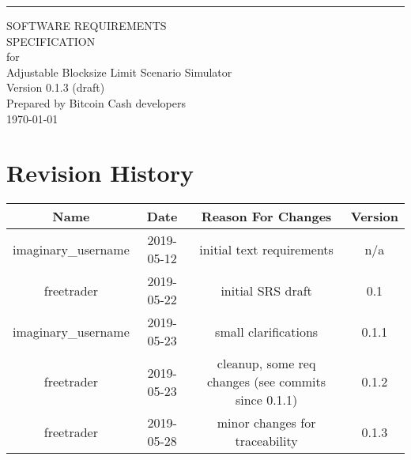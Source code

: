 \documentclass{scrreprt}
\date{}
\def\myversion{0.1.3 }
\begin{document}
\begin{flushright}
  \rule{16cm}{5pt}\vskip1cm
  \begin{bfseries}
    \Huge{SOFTWARE REQUIREMENTS\\ SPECIFICATION}\\
    \vspace{1.9cm}
    for\\
    \vspace{1.9cm}
    Adjustable Blocksize Limit Scenario Simulator\\
    \vspace{1.9cm}
    \LARGE{Version \myversion (draft)}\\
    \vspace{1.9cm}
    Prepared by Bitcoin Cash developers\\
    \vspace{1.9cm}
    \today\\
  \end{bfseries}
\end{flushright}

\tableofcontents

\chapter*{Revision History}

  \begin{center}
    \begin{tabular}{|c|c|c|c|}
      \hline
      Name                & Date       & Reason For Changes                                  & Version \\
      \hline
      imaginary\_username & 2019-05-12 & initial text requirements                           & n/a     \\
      \hline
      freetrader          & 2019-05-22 & initial SRS draft                                   & 0.1     \\
      \hline
      imaginary\_username & 2019-05-23 & small clarifications                                & 0.1.1   \\
      \hline
      freetrader          & 2019-05-23 & cleanup, some req changes (see commits since 0.1.1) & 0.1.2   \\
      \hline
      freetrader          & 2019-05-28 & minor changes for traceability                      & 0.1.3   \\
      \hline
    \end{tabular}
  \end{center}
\end{document}
